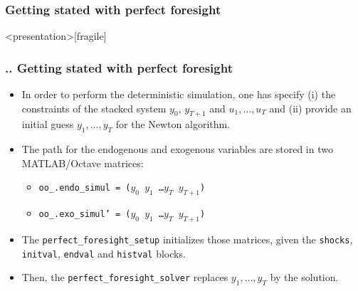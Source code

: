 \documentclass[11pt,aspectratio=169]{beamer}
\begin{document}
\subsubsection{Getting stated with perfect foresight}
\begin{frame}<presentation>[fragile]
	\frametitle{{\thesection.\thesubsection.\thesubsubsection} Getting stated with perfect foresight}
	\begin{itemize}
		\justifying
		\item In order to perform the deterministic simulation, one has specify (i) the constraints of the stacked system $y_0$, $y_{T+1}$ and $u_1, \ldots , u_T$ and (ii) provide an initial guess $y_1, \ldots , y_T$ for the Newton algorithm. 
		\item The path for the endogenous and exogenous variables are stored in two MATLAB/Octave matrices:
		\begin{itemize}
			\item \texttt{oo\_.endo\_simul = ($y_0$  $y_1$ \ldots  $y_T$  $y_{T+1}$)}
			\item \texttt{oo\_.exo\_simul' = ($y_0$  $y_1$ \ldots  $y_T$  $y_{T+1}$)}
		\end{itemize}
		\item The \texttt{perfect\_foresight\_setup} initializes those matrices, given the \texttt{shocks}, \texttt{initval}, \texttt{endval} and \texttt{histval} blocks.
		\item Then, the \texttt{perfect\_foresight\_solver} replaces $y_1,\ldots,y_T$ by the solution. 
	\end{itemize}
\end{frame}
\end{document}
